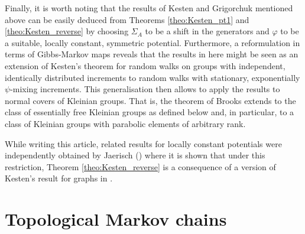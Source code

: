 \documentclass[10pt]{article}
\theoremstyle{mystyle}
\newcommand{\Sig}{{\Sigma}}
\newcommand{\1}{\mathbf{1}}
\begin{document}
Finally, it is worth noting that the results of Kesten and Grigorchuk mentioned above can be easily deduced from Theorems \ref{theo:Kesten_pt1} and \ref{theo:Kesten_reverse} by choosing $\Sig_A$ to be a shift in the generators and $\varphi$ to be a suitable, locally constant, symmetric potential. Furthermore, a reformulation in terms of Gibbs-Markov maps reveals that the results in here might be seen as an extension of Kesten's theorem for random walks on groups with independent, identically distributed increments to random walks with stationary, exponentially $\psi$-mixing increments. This generalisation then allows to apply the results to normal covers of Kleinian groups. That is, the theorem of Brooks extends to the class of essentially free Kleinian groups as defined below and, in particular, to a class of Kleinian groups with parabolic elements of arbitrary rank. 

While writing this article, related results for locally constant potentials were independently obtained by Jaerisch (\cite{Jaerisch:2011}) where it is shown that under this restriction, Theorem \ref{theo:Kesten_reverse} is a consequence of a version of Kesten's result for graphs in \cite{OrtnerWoess:2007}.  


\section{Topological Markov chains}
\end{document}
